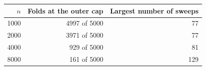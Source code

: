 \begin{tabular}{rrr}
\hline
$n$ & Folds at the outer cap & Largest number of sweeps \\
\hline
1000 & 4997 of 5000 & 77 \\
2000 & 3971 of 5000 & 77 \\
4000 & 929 of 5000 & 81 \\
8000 & 161 of 5000 & 129 \\
\hline
\end{tabular}

